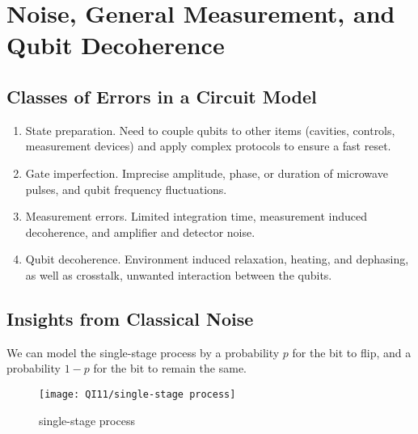 \newpage
\section{Noise, General Measurement, and Qubit Decoherence}

\subsection{Classes of Errors in a Circuit Model}
\begin{enumerate}\small
    \item State preparation. Need to couple qubits to other items (cavities, controls, measurement devices) and apply complex protocols to ensure a fast reset. 
    \item Gate imperfection. Imprecise amplitude, phase, or duration of microwave pulses, and qubit frequency fluctuations. 
    \item Measurement errors. Limited integration time, measurement induced decoherence, and amplifier and detector noise. 
    \item Qubit decoherence. Environment induced relaxation, heating, and dephasing, as well as crosstalk, unwanted interaction between the qubits.
\end{enumerate}

\subsection{Insights from Classical Noise}
We can model the single-stage process by a probability $p$ for the bit to flip, and a probability $1-p$ for the bit to remain the same. 

\begin{figure}[!htb]
    \centering
    \texttt{[image: QI11/single-stage process]}
    \caption{single-stage process}
\end{figure}

